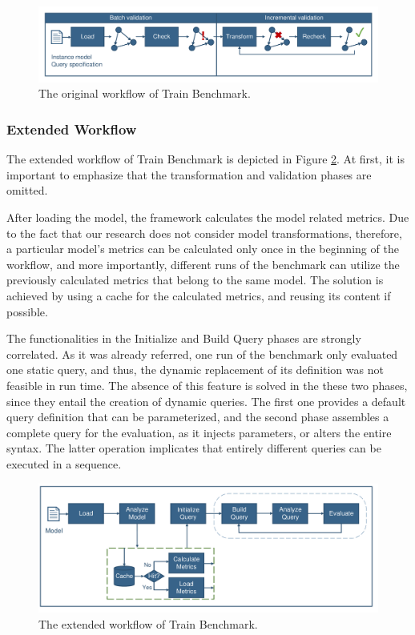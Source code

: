 \begin{figure}[!ht]
	\centering
	\includegraphics[width=150mm, keepaspectratio]{figures/trainbenchmark-sequence.pdf}
	\caption{The original workflow of Train Benchmark.}
	\label{fig:old_train_workflow}
\end{figure}

\subsubsection{Extended Workflow}\label{sec:extended_workflow}

The extended workflow of Train Benchmark is depicted in Figure \ref{fig:new_train_workflow}. At first, it is important to emphasize that the transformation and validation phases are omitted. 

After loading the model, the framework calculates the model related metrics. Due to the fact that our research does not consider model transformations, therefore, a particular model's metrics can be calculated only once in the beginning of the workflow, and more importantly, different runs of the benchmark can utilize the previously calculated metrics that belong to the same model. The solution is achieved by using a cache for the calculated metrics, and reusing its content if possible.

The functionalities in the \textsf{Initialize} and \textsf{Build Query} phases are strongly correlated. As it was already referred, one run of the benchmark only evaluated one static query, and thus, the dynamic replacement of its definition was not feasible in run time. The absence of this feature is solved in the these two phases, since they entail the creation of dynamic queries. The first one provides a default query definition that can be parameterized, and the second phase assembles a complete query for the evaluation, as it injects parameters, or alters the entire syntax. The latter operation implicates that entirely different queries can be executed in a sequence.

\begin{figure}[!ht]
	\centering
	\includegraphics[width=150mm, keepaspectratio]{figures/workflow.pdf}
	\caption{The extended workflow of Train Benchmark.}
	\label{fig:new_train_workflow}
\end{figure}


